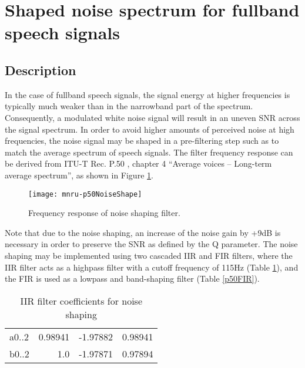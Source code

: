 \section{Shaped noise spectrum for fullband speech signals} \label{fullband}

\subsection {Description}

In the case of fullband speech signals, the signal energy at higher frequencies is typically much weaker than in the
narrowband part of the spectrum.
Consequently, a modulated white noise signal will result in an uneven SNR across the signal spectrum.
In order to avoid higher amounts of perceived noise at high frequencies, the noise signal may be shaped in a pre-filtering
step such as to match the average spectrum of speech signals.
The filter frequency response can be derived from ITU-T Rec. P.50 \cite{P.50}, chapter 4 “Average voices – Long-term
average spectrum”, as shown in Figure \ref{MNRUP50}.

\begin{figure}[ht]
    \begin{center}
        \texttt{[image: mnru-p50NoiseShape]}
    \end{center}
    \caption{Frequency response of noise shaping filter.\label{MNRUP50}}
\end{figure}

Note that due to the noise shaping, an increase of the noise gain by +9dB is necessary in order to preserve the SNR as
defined by the Q parameter.
The noise shaping may be implemented using two cascaded IIR and FIR filters, where the IIR filter acts as a highpass
filter with a cutoff frequency of 115Hz (Table \ref{p50IIR}), and the FIR is used as a lowpass and band-shaping filter
(Table \ref{p50FIR}).

\begin{table}
    \centering
    \begin{tabular}{lrrr}
        a0..2 & 0.98941 & -1.97882 & 0.98941 \\
        b0..2 & 1.0 & -1.97871 & 0.97894 \\

    \end{tabular}
    \caption{IIR filter coefficients for noise shaping}
    \label{p50IIR}
\end{table}



